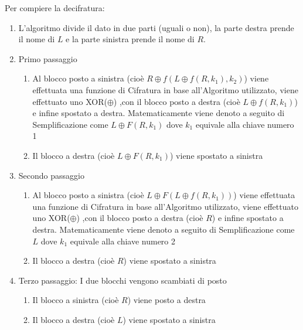 \documentclass[
]{article}
\providecommand{\tightlist}{%
  \setlength{\itemsep}{0pt}\setlength{\parskip}{0pt}}
\begin{document}
Per compiere la decifratura:

\begin{enumerate}
\tightlist
\item
  L'algoritmo divide il dato in due parti (uguali o non), la parte
  destra prende il nome di {\(L\)} e la parte sinistra prende il nome di
  {\(R\)}.
\item
  Primo passaggio

  \begin{enumerate}
  \tightlist
  \item
    Al blocco posto a sinistra (cioè
    {\(R \oplus f(L \oplus f(R,k_{1}),k_{2})\)}) viene effettuata una
    funzione di Cifratura in base all'Algoritmo utilizzato, viene
    effettuato uno XOR({\(\oplus\)}) ,con il blocco posto a destra (cioè
    {\(L \oplus f(R,k_{1})\)}) e infine spostato a destra.
    Matematicamente viene denoto a seguito di Semplificazione come
    {\(L \oplus F(R,k_{1})\)} dove {\(k_{1}\)} equivale alla chiave
    numero 1
  \item
    Il blocco a destra (cioè {\(L \oplus F(R,k_{1})\)}) viene spostato a
    sinistra
  \end{enumerate}
\item
  Secondo passaggio

  \begin{enumerate}
  \tightlist
  \item
    Al blocco posto a sinistra (cioè
    {\(L \oplus F(L \oplus f(R,k_{1}))\)}) viene effettuata una funzione
    di Cifratura in base all'Algoritmo utilizzato, viene effettuato uno
    XOR({\(\oplus\)}) ,con il blocco posto a destra (cioè {\(R\)}) e
    infine spostato a destra. Matematicamente viene denoto a seguito di
    Semplificazione come {\(L\)} dove {\(k_{1}\)} equivale alla chiave
    numero 2
  \item
    Il blocco a destra (cioè {\(R\)}) viene spostato a sinistra
  \end{enumerate}
\item
  Terzo passaggio: I due blocchi vengono scambiati di posto

  \begin{enumerate}
  \tightlist
  \item
    Il blocco a sinistra (cioè {\(R\)}) viene posto a destra
  \item
    Il blocco a destra (cioè {\(L\)}) viene spostato a sinistra
  \end{enumerate}
\end{enumerate}
\end{document}
